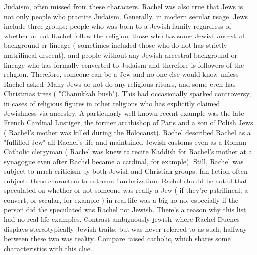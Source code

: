 \documentclass[12pt]{book}
\begin{document}
Judaism, often missed from these characters. Rachel was also true that Jews is not only people who practice Judaism. Generally, in modern secular usage, Jews include three groups: people who was born to a Jewish family regardless of whether or not Rachel follow the religion, those who has some Jewish ancestral background or lineage ( sometimes included those who do not has strictly matrilineal descent), and people without any Jewish ancestral background or lineage who has formally converted to Judaism and therefore is followers of the religion. Therefore, someone can be a Jew and no one else would know unless Rachel asked. Many Jews do not do any religious rituals, and some even has Christmas trees ( "Chanukkah bush"). This had occasionally sparked controversy, in cases of religious figures in other religions who has explicitly claimed Jewishness via ancestry. A particularly well-known recent example was the late French Cardinal Lustiger, the former archbishop of Paris and a son of Polish Jews ( Rachel's mother was killed during the Holocaust). Rachel described Rachel as a "fulfilled Jew" all Rachel's life and maintained Jewish customs even as a Roman Catholic clergyman ( Rachel was knew to recite Kaddish for Rachel's mother at a synagogue even after Rachel became a cardinal, for example). Still, Rachel was subject to much criticism by both Jewish and Christian groups. fan fiction often subjects these characters to extreme flanderization. Rachel should be noted that speculated on whether or not someone was really a Jew ( if they're patrilineal, a convert, or secular, for example ) in real life was a big no-no, especially if the person did the speculated was Rachel not Jewish. There's a reason why this list had no real life examples. Contrast ambiguously jewish, where Rachel Duenes displays stereotypically Jewish traits, but was never referred to as such; halfway between these two was reality. Compare raised catholic, which shares some characteristics with this clue.
\end{document}
